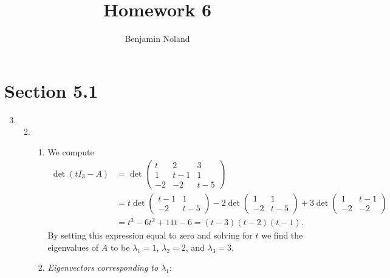 \documentclass[12pt]{article}
\title{Homework 6}
\author{Benjamin Noland}
\date{}
\begin{document}
\maketitle

\section*{Section 5.1}

\begin{enumerate}
\setcounter{enumi}{2}
\item
\begin{enumerate}
\setcounter{enumii}{1}
\item
\begin{enumerate}[label=(\roman*)]
\item
We compute
\begin{align*}
\det(tI_3 - A)
&= \det\begin{pmatrix}
t & 2 & 3 \\
1 & t - 1 & 1 \\
-2 & -2 & t - 5
\end{pmatrix} \\
&= t \det\begin{pmatrix}
t - 1 & 1 \\
-2 & t - 5
\end{pmatrix}
-2 \det\begin{pmatrix}
1 & 1 \\
-2 & t - 5
\end{pmatrix}
+3 \det\begin{pmatrix}
1 & t - 1 \\
-2 & -2
\end{pmatrix} \\
&= t^3 - 6t^2 + 11t - 6 = (t - 3)(t - 2)(t - 1).
\end{align*}
By setting this expression equal to zero and solving for $t$ we find the eigenvalues of $A$ to be $\lambda_1 = 1$, $\lambda_2 = 2$, and $\lambda_3 = 3$.

\item
{\it Eigenvectors corresponding to $\lambda_1$}:


\end{enumerate}
\end{enumerate}
\end{enumerate}
\end{document}
